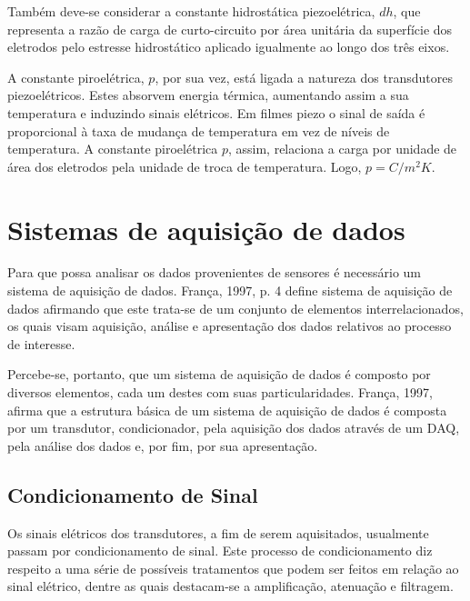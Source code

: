 \documentclass[
	12pt,				
	oneside,			
	a4paper,			
	english,			
	brazil,			
	]{abntex2ppgsi}
\begin{document}

Também deve-se considerar a constante hidrostática piezoelétrica, $dh$, que representa a razão de carga de curto-circuito por área unitária da superfície dos eletrodos pelo estresse hidrostático aplicado igualmente ao longo dos três eixos. 

A constante piroelétrica, $p$, por sua vez, está ligada a natureza dos transdutores piezoelétricos. Estes absorvem energia térmica, aumentando assim a sua temperatura e induzindo sinais elétricos. Em filmes piezo o sinal de saída é proporcional à taxa de mudança de temperatura em vez de níveis de temperatura. A constante piroelétrica $p$, assim, relaciona a carga por unidade de área dos eletrodos pela unidade de troca de temperatura. Logo, $p = C/m^{2} K$.


\newpage
\section{\textbf{Sistemas de aquisição de dados}}

Para que possa analisar os dados provenientes de sensores é necessário um sistema de aquisição de dados. França, 1997, p. 4 define sistema de aquisição de dados afirmando que este trata-se de um conjunto de elementos interrelacionados, os quais visam aquisição, análise e apresentação dos dados relativos ao processo de interesse.

Percebe-se, portanto, que um sistema de aquisição de dados é composto por diversos elementos, cada um destes com suas particularidades. França, 1997, afirma que a estrutura básica de um sistema de aquisição de dados é composta por um transdutor, condicionador, pela aquisição dos dados através de um DAQ, pela análise dos dados e, por fim, por sua apresentação. 


\subsection{\textbf{Condicionamento de Sinal}}

Os sinais elétricos dos transdutores, a fim de serem aquisitados, usualmente passam por condicionamento de sinal. Este processo de condicionamento diz respeito a uma série de possíveis tratamentos que podem ser feitos em relação ao sinal elétrico, dentre as quais destacam-se a amplificação, atenuação e filtragem. 
\end{document}
